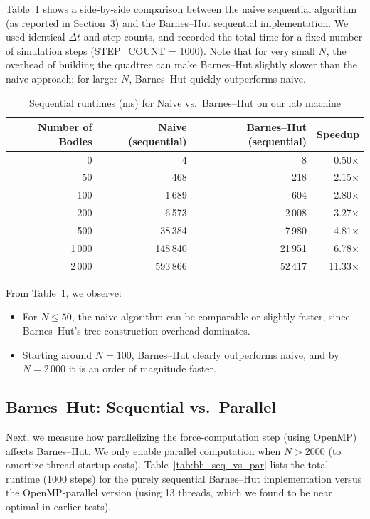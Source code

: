 \documentclass{article}
\begin{document}
Table~\ref{tab:naive_vs_bh} shows a side‐by‐side comparison between the naive sequential algorithm (as reported in Section~3) and the Barnes–Hut sequential implementation.  We used identical $\Delta t$ and step counts, and recorded the total time for a fixed number of simulation steps (STEP\_COUNT = 1000).  Note that for very small $N$, the overhead of building the quadtree can make Barnes–Hut slightly slower than the naive approach; for larger $N$, Barnes–Hut quickly outperforms naive.

\begin{table}[H]
    \centering
    \begin{tabular}{|r|r|r|r|}
    \hline
    \textbf{Number of Bodies} & \textbf{Naive (sequential)} & \textbf{Barnes–Hut (sequential)} & \textbf{Speedup}\\
    \hline
    0     & 4      & 8       & 0.50× \\ 
    50    & 468    & 218     & 2.15× \\ 
    100   & 1\,689 & 604     & 2.80× \\ 
    200   & 6\,573 & 2\,008  & 3.27× \\ 
    500   & 38\,384& 7\,980  & 4.81× \\ 
    1\,000 & 148\,840 & 21\,951 & 6.78× \\ 
    2\,000 & 593\,866 & 52\,417 & 11.33× \\ 
    \hline
    \end{tabular}
    \caption{Sequential runtimes (ms) for Naive vs.\ Barnes–Hut on our lab machine}
    \label{tab:naive_vs_bh}
\end{table}

\noindent
From Table~\ref{tab:naive_vs_bh}, we observe:
\begin{itemize}
  \item For $N \le 50$, the naive algorithm can be comparable or slightly faster, since Barnes–Hut’s tree‐construction overhead dominates.
  \item Starting around $N = 100$, Barnes–Hut clearly outperforms naive, and by $N=2\,000$ it is an order of magnitude faster.
\end{itemize}

\subsection{Barnes–Hut: Sequential vs.\ Parallel}

Next, we measure how parallelizing the force‐computation step (using OpenMP) affects Barnes–Hut.  We only enable parallel computation when $N>2000$ (to amortize thread‐startup costs).  Table~\ref{tab:bh_seq_vs_par} lists the total runtime (1000 steps) for the purely sequential Barnes–Hut implementation versus the OpenMP‐parallel version (using 13 threads, which we found to be near optimal in earlier tests).
\end{document}
